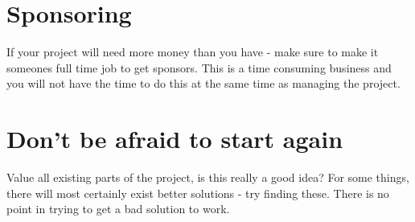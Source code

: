\documentclass[12pt,a4paper]{article}
\begin{document}
\section{Sponsoring}
If your project will need more money than you have - make sure to make it someones full time job to get sponsors. This is a time consuming business and you will not have the time to do this at the same time as managing the project. 

\section{Don't be afraid to start again}
Value all existing parts of the project, is this really a good idea? For some things, there will most certainly exist better solutions - try finding these. There is no point in trying to get a bad solution to work. 
\end{document}
